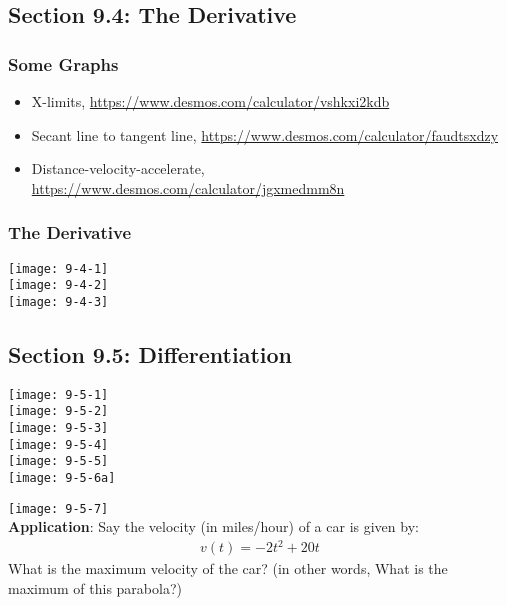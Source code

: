 \documentclass[14pt]{extarticle}
\begin{document}
\subsection*{Section 9.4: The Derivative}
\subsubsection*{Some Graphs}
\begin{itemize}
	\item X-limits, \url{https://www.desmos.com/calculator/vshkxi2kdb}
	\item Secant line to tangent line, \url{https://www.desmos.com/calculator/faudtsxdzy}
	\item Distance-velocity-accelerate, \url{https://www.desmos.com/calculator/jgxmedmm8n}
\end{itemize}
\subsubsection*{The Derivative}
\begin{center}
	\texttt{[image: 9-4-1]} \\
	\texttt{[image: 9-4-2]} \\
	\texttt{[image: 9-4-3]} \\
\end{center}

\cleardoublepage

\subsection*{Section 9.5: Differentiation}
\begin{center}
	\texttt{[image: 9-5-1]} \\
	\texttt{[image: 9-5-2]} \\
	\texttt{[image: 9-5-3]} \\
	\texttt{[image: 9-5-4]} \\
	\texttt{[image: 9-5-5]} \\
	\texttt{[image: 9-5-6a]} \\
\end{center}
\texttt{[image: 9-5-7]}
\\
\textbf{Application}: Say the velocity (in miles/hour) of a car is given by:
\begin{align*}
v(t)=-2t^2 + 20t
\end{align*}
What is the maximum velocity of the car? (in other words, What is the maximum of this parabola?)
\end{document}
